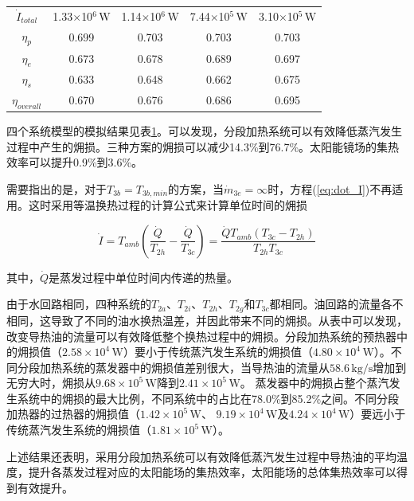 \begin{table}[htbp]
\begin{center}
\begin{tabular}{ccccc}
		$\dot{I}_{total}$    &    1.33$\times$10$^6\,\mathrm{W}$    &  1.14$\times$10$^6\,\mathrm{W}$  &	7.44$\times$10$^5\,\mathrm{W}$	&	3.10$\times$10$^5\,\mathrm{W}$\\
		$\eta_p$    &    0.699    &	0.703	&    0.703	&	0.703\\
		$\eta_e$    &    0.673    &	0.678	& 0.689	&	0.697\\
		$\eta_s$    &    0.633    &  0.648	&  0.662	&	0.675\\
		$\eta_{overall}$    &    0.670   &	0.676	&    0.686	&	0.695\\
		\bottomrule
	\end{tabular}
	\end{center}
	\label{tab:comparison}
\end{table}

四个系统模型的模拟结果见表\ref{tab:comparison}。可以发现，分段加热系统可以有效降低蒸汽发生过程中产生的㶲损。三种方案的㶲损可以减少14.3\%到76.7\%。太阳能镜场的集热效率可以提升0.9\%到3.6\%。

需要指出的是，对于$T_{3b} = T_{3b,min}$的方案，当$\dot{m}_{3e} = \infty$时，方程(\ref{eq:dot_I})不再适用。这时采用等温换热过程的计算公式来计算单位时间的㶲损

\begin{equation}
  \dot{I} = T_{amb} (\frac{\dot{Q}}{T_{2h}} - \frac{\dot{Q}}{T_{3c}}) = \frac{\dot{Q}T_{amb}(T_{3c} - T_{2h})}{T_{2h}T_{3c}}
  \label{eq:isothermal}
\end{equation}

其中，$\dot{Q}$是蒸发过程中单位时间内传递的热量。

由于水回路相同，四种系统的$T_{2a}$、$T_{2i}$、$T_{2h}$、$T_{2g}$和$T_{3c}$都相同。油回路的流量各不相同，这导致了不同的油水换热温差，并因此带来不同的㶲损。从表中可以发现，改变导热油的流量可以有效降低整个换热过程中的㶲损。分段加热系统的预热器中的㶲损值（$2.58\times 10^4\,\mathrm{W}$）要小于传统蒸汽发生系统的㶲损值（$4.80\times10^4\,\mathrm{W}$）。不同分段加热系统的蒸发器中的㶲损值差别很大，当导热油的流量从$58.6\,\mathrm{kg/s}$增加到无穷大时，㶲损从$9.68\times10^5\,\mathrm{W}$降到$2.41\times10^5\,\mathrm{W}$。
蒸发器中的㶲损占整个蒸汽发生系统中的㶲损的最大比例，不同系统中的占比在78.0\%到85.2\%之间。不同分段加热器的过热器的㶲损值（$1.42\times 10^5\,\mathrm{W}$、 $9.19\times 10^4\,\mathrm{W}$及$4.24\times 10^4\,\mathrm{W}$）要远小于传统蒸汽发生系统的㶲损值（$1.81\times10^5\,\mathrm{W}$）。

上述结果还表明，采用分段加热系统可以有效降低蒸汽发生过程中导热油的平均温度，提升各蒸发过程对应的太阳能场的集热效率，太阳能场的总体集热效率可以得到有效提升。


